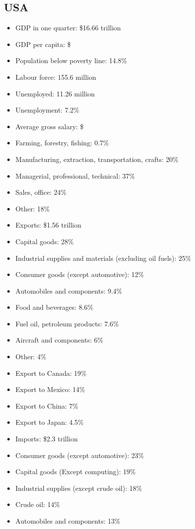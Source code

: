 \documentclass{article}
\begin{document}
\subsection{USA}
\begin{itemize}
	\item GDP in one quarter: \$16.66 trillion
	\item GDP per capita: \$
	\item Population below poverty line: 14.8\%
	\item Labour force: 155.6 million
	\item Unemployed: 11.26 million
	\item Unemployment: 7.2\%
	\item Average gross salary: \$
	\item Farming, forestry, fishing: 0.7\%
	\item Manufacturing, extraction, transportation, crafts: 20\%
	\item Managerial, professional, technical: 37\%
	\item Sales, office: 24\%
	\item Other: 18\%
	\item Exports: \$1.56 trillion
	\item Capital goods: 28\%
	\item Industrial supplies and materials (excluding oil fuels): 25\%
	\item Consumer goods (except automotive): 12\%
	\item Automobiles and components: 9.4\%
	\item Food and beverages: 8.6\%
	\item Fuel oil, petroleum products: 7.6\%
	\item Aircraft and components: 6\%
	\item Other: 4\%
	\item Export to Canada: 19\%
	\item Export to Mexico: 14\%
	\item Export to China: 7\%
	\item Export to Japan: 4.5\%
	\item Imports: \$2.3 trillion
	\item Consumer goods (except automotive): 23\%
	\item Capital goods (Except computing): 19\%
	\item Industrial supplies (except crude oil): 18\%
	\item Crude oil: 14\%
	\item Automobiles and components: 13\%

\end{itemize}
\end{document}
